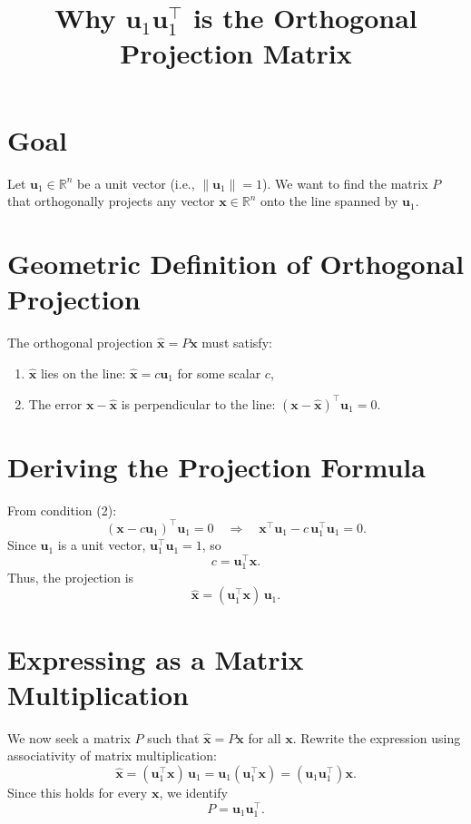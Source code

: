 \documentclass{article}
\title{Why $ \mathbf{u}_1 \mathbf{u}_1^\top $ is the Orthogonal Projection Matrix}
\author{}
\date{}
\begin{document}
\maketitle

\Large

\section*{Goal}

Let $ \mathbf{u}_1 \in \mathbb{R}^n $ be a unit vector (i.e., $ \|\mathbf{u}_1\| = 1 $).  
We want to find the matrix $ P $ that orthogonally projects any vector $ \mathbf{x} \in \mathbb{R}^n $ onto the line spanned by $ \mathbf{u}_1 $.

\section*{Geometric Definition of Orthogonal Projection}

The orthogonal projection $ \hat{\mathbf{x}} = P\mathbf{x} $ must satisfy:
\begin{enumerate}
    \item $ \hat{\mathbf{x}} $ lies on the line: $ \hat{\mathbf{x}} = c \mathbf{u}_1 $ for some scalar $ c $,
    \item The error $ \mathbf{x} - \hat{\mathbf{x}} $ is perpendicular to the line: $ (\mathbf{x} - \hat{\mathbf{x}})^\top \mathbf{u}_1 = 0 $.
\end{enumerate}

\section*{Deriving the Projection Formula}

From condition (2):
\[
(\mathbf{x} - c \mathbf{u}_1)^\top \mathbf{u}_1 = 0
\quad \Rightarrow \quad
\mathbf{x}^\top \mathbf{u}_1 - c \, \mathbf{u}_1^\top \mathbf{u}_1 = 0.
\]
Since $ \mathbf{u}_1 $ is a unit vector, $ \mathbf{u}_1^\top \mathbf{u}_1 = 1 $, so
\[
c = \mathbf{u}_1^\top \mathbf{x}.
\]
Thus, the projection is
\[
\hat{\mathbf{x}} = (\mathbf{u}_1^\top \mathbf{x}) \, \mathbf{u}_1.
\]

\section*{Expressing as a Matrix Multiplication}

We now seek a matrix $ P $ such that $ \hat{\mathbf{x}} = P\mathbf{x} $ for all $ \mathbf{x} $.  
Rewrite the expression using associativity of matrix multiplication:
\[
\hat{\mathbf{x}} = (\mathbf{u}_1^\top \mathbf{x}) \, \mathbf{u}_1
= \mathbf{u}_1 (\mathbf{u}_1^\top \mathbf{x})
= (\mathbf{u}_1 \mathbf{u}_1^\top) \mathbf{x}.
\]
Since this holds for every $ \mathbf{x} $, we identify
\[
P = \mathbf{u}_1 \mathbf{u}_1^\top.
\]
\end{document}
